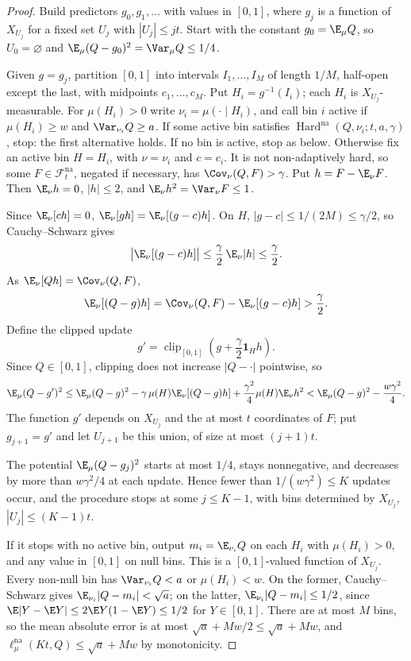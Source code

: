 \begin{proof}
Build predictors \(g_0,g_1,\ldots\) with values in \([0,1]\), where
\(g_j\) is a function of \(X_{U_j}\) for a fixed set \(U_j\) with
\(|U_j|\le jt\). Start with the constant \(g_0=\E_\mu Q\), so
\(U_0=\varnothing\) and \(\E_\mu(Q-g_0)^2=\Var_\mu Q\le1/4\).

Given \(g=g_j\), partition \([0,1]\) into intervals
\(I_1,\ldots,I_M\) of length \(1/M\), half-open except the last, with
midpoints \(c_1,\ldots,c_M\). Put \(H_i=g^{-1}(I_i)\); each \(H_i\) is
\(X_{U_j}\)-measurable. For \(\mu(H_i)>0\) write
\(\nu_i=\mu(\cdot\mid H_i)\), and call bin \(i\) active if
\(\mu(H_i)\ge w\) and \(\Var_{\nu_i}Q\ge a\). If some active bin satisfies
\(\operatorname{Hard}^{\mathrm{na}}(Q,\nu_i;t,a,\gamma)\), stop: the first
alternative holds. If no bin is active, stop as below. Otherwise fix
an active bin \(H=H_i\), with \(\nu=\nu_i\) and \(c=c_i\). It is not
non-adaptively hard, so some \(F\in\mathcal F_t^{\mathrm{na}}\),
negated if necessary, has \(\Cov_\nu(Q,F)>\gamma\). Put
\(h=F-\E_\nu F\). Then \(\E_\nu h=0\), \(|h|\le2\), and
\(\E_\nu h^2=\Var_\nu F\le1\).

Since \(\E_\nu[ch]=0\), \(\E_\nu[gh]=\E_\nu[(g-c)h]\). On \(H\),
\(|g-c|\le1/(2M)\le\gamma/2\), so Cauchy--Schwarz gives
\[
 \bigl|\E_\nu[(g-c)h]\bigr|\le\frac\gamma2\,\E_\nu|h|
 \le\frac\gamma2.
\]
As \(\E_\nu[Qh]=\Cov_\nu(Q,F)\),
\[
 \E_\nu[(Q-g)h]=\Cov_\nu(Q,F)-\E_\nu[(g-c)h]>\frac\gamma2.
\]
Define the clipped update
\[
 g'=\operatorname{clip}_{[0,1]}
       \left(g+\frac\gamma2\mathbf1_Hh\right).
\]
Since \(Q\in[0,1]\), clipping does not increase \(|Q-\cdot|\)
pointwise, so
\[
 \E_\mu(Q-g')^2
 \le\E_\mu(Q-g)^2
 -\gamma\,\mu(H)\E_\nu[(Q-g)h]
 +\frac{\gamma^2}4\mu(H)\E_\nu h^2
 <\E_\mu(Q-g)^2-\frac{w\gamma^2}4.
\]
The function \(g'\) depends on \(X_{U_j}\) and the at most \(t\)
coordinates of \(F\); put \(g_{j+1}=g'\) and let \(U_{j+1}\) be this union,
of size at most \((j+1)t\).

The potential \(\E_\mu(Q-g_j)^2\) starts at most \(1/4\), stays
nonnegative, and decreases by more than \(w\gamma^2/4\) at each update.
Hence fewer than \(1/(w\gamma^2)\le K\) updates occur, and the procedure
stops at some \(j\le K-1\), with bins determined by
\(X_{U_j}\), \(|U_j|\le(K-1)t\).

If it stops with no active bin, output \(m_i=\E_{\nu_i}Q\) on each
\(H_i\) with \(\mu(H_i)>0\), and any value in \([0,1]\) on null bins.
This is a \([0,1]\)-valued function of \(X_{U_j}\). Every non-null bin
has \(\Var_{\nu_i}Q<a\) or \(\mu(H_i)<w\). On the former,
Cauchy--Schwarz gives \(\E_{\nu_i}|Q-m_i|<\sqrt a\); on the latter,
\(\E_{\nu_i}|Q-m_i|\le1/2\), since \(\E|Y-\E Y|\le2\E Y(1-\E Y)\le1/2\)
for \(Y\in[0,1]\). There are at most \(M\) bins, so the mean absolute
error is at most \(\sqrt a+Mw/2\le\sqrt a+Mw\), and
\(\ell_\mu^{\mathrm{na}}(Kt,Q)\le\sqrt a+Mw\) by monotonicity.
\end{proof}

